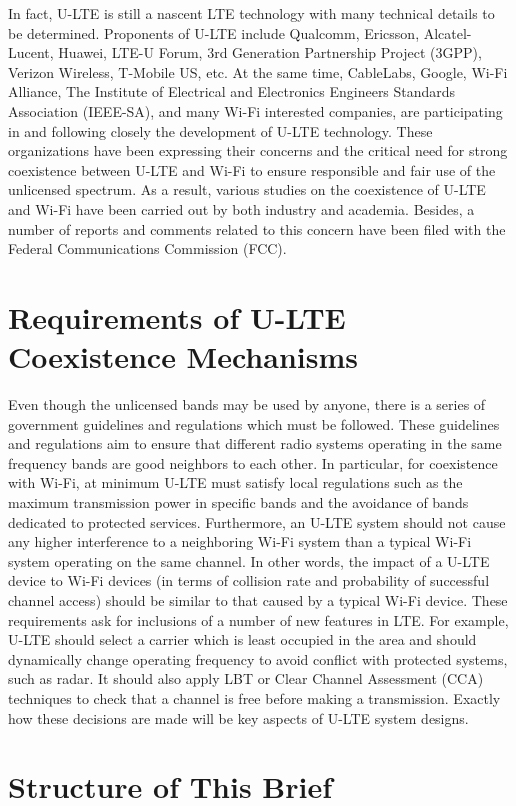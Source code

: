 In fact, U-LTE is still a nascent LTE technology with many technical details to be determined. Proponents of U-LTE include Qualcomm, Ericsson, Alcatel-Lucent, Huawei, LTE-U Forum, 3rd Generation Partnership Project (3GPP), Verizon Wireless, T-Mobile US, etc. At the same time, CableLabs, Google, Wi-Fi Alliance, The Institute of Electrical and Electronics Engineers Standards Association (IEEE-SA), and many Wi-Fi interested companies, are participating in and following closely the development of U-LTE technology. These organizations have been expressing their concerns and the critical need for strong coexistence between U-LTE and Wi-Fi to ensure responsible and fair use of the unlicensed spectrum. As a result, various studies on the coexistence of U-LTE and Wi-Fi have been carried out by both industry and academia. Besides, a number of reports and comments related to this concern have been filed with the Federal Communications Commission (FCC).


\section{Requirements of U-LTE Coexistence Mechanisms}
\label{reqs}
Even though the unlicensed bands may be used by anyone, there is a series of government guidelines and regulations which must be followed. These guidelines and regulations aim to ensure that different radio systems operating in the same frequency bands are good neighbors to each other. In particular, for coexistence with Wi-Fi, at minimum U-LTE must satisfy local regulations such as the maximum transmission power in specific bands and the avoidance of bands dedicated to protected services. Furthermore, an U-LTE system should not cause any higher interference to a neighboring Wi-Fi system than a typical Wi-Fi system operating on the same channel. In other words, the impact of a U-LTE device to Wi-Fi devices (in terms of collision rate and probability of successful channel access) should be similar to that caused by a typical Wi-Fi device. These requirements ask for inclusions of a number of new features in LTE. For example, U-LTE should select a carrier which is least occupied in the area and should dynamically change operating frequency to avoid conflict with protected systems, such as radar. It should also apply LBT or Clear Channel Assessment (CCA) techniques to check that a channel is free before making a transmission. Exactly how these decisions are made will be key aspects of U-LTE system designs.


\section{Structure of This Brief}

